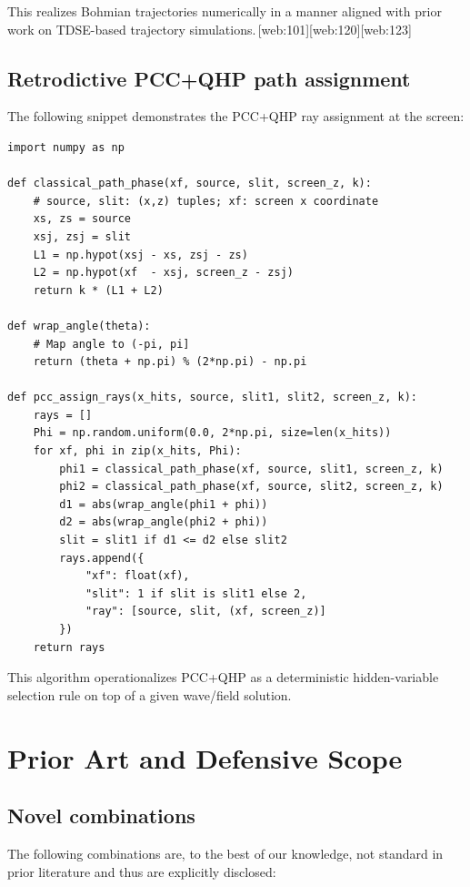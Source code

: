 \documentclass[11pt]{article}
\begin{document}
This realizes Bohmian trajectories numerically in a manner aligned with prior work on TDSE-based trajectory simulations.\,[web:101][web:120][web:123]

\subsection{Retrodictive PCC+QHP path assignment}

The following snippet demonstrates the PCC+QHP ray assignment at the screen:

\begin{verbatim}
import numpy as np

def classical_path_phase(xf, source, slit, screen_z, k):
    # source, slit: (x,z) tuples; xf: screen x coordinate
    xs, zs = source
    xsj, zsj = slit
    L1 = np.hypot(xsj - xs, zsj - zs)
    L2 = np.hypot(xf  - xsj, screen_z - zsj)
    return k * (L1 + L2)

def wrap_angle(theta):
    # Map angle to (-pi, pi]
    return (theta + np.pi) % (2*np.pi) - np.pi

def pcc_assign_rays(x_hits, source, slit1, slit2, screen_z, k):
    rays = []
    Phi = np.random.uniform(0.0, 2*np.pi, size=len(x_hits))
    for xf, phi in zip(x_hits, Phi):
        phi1 = classical_path_phase(xf, source, slit1, screen_z, k)
        phi2 = classical_path_phase(xf, source, slit2, screen_z, k)
        d1 = abs(wrap_angle(phi1 + phi))
        d2 = abs(wrap_angle(phi2 + phi))
        slit = slit1 if d1 <= d2 else slit2
        rays.append({
            "xf": float(xf),
            "slit": 1 if slit is slit1 else 2,
            "ray": [source, slit, (xf, screen_z)]
        })
    return rays
\end{verbatim}

This algorithm operationalizes PCC+QHP as a deterministic hidden-variable selection rule on top of a given wave/field solution.

\section{Prior Art and Defensive Scope}

\subsection{Novel combinations}

The following combinations are, to the best of our knowledge, not standard in prior literature and thus are explicitly disclosed:
\end{document}

